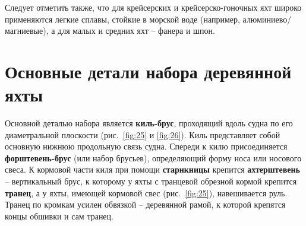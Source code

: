 \documentclass[a4paper, 12pt, twoside, final]{scrbook}
\begin{document}
Следует отметить также, что для крейсерских и крейсерско-гоночных
яхт широко применяются легкие сплавы, стойкие в морской воде (например,
алюминиево\-/магниевые), а для малых и средних яхт \--- фанера и шпон.

%
%

\section{Основные детали набора деревянной яхты}

Основной деталью набора является \textbf{киль-брус}, проходящий вдоль
судна по его диаметральной плоскости (рис.~\ref{fig:25}
и \ref{fig:26}).
Киль представляет собой основную нижнюю продольную связь судна. Спереди
к килю присоединяется \textbf{форштевень-брус} (или набор брусьев),
определяющий форму носа или носового свеса. К кормовой части киля
при помощи \textbf{старнкницы} крепится \textbf{ахтерштевень} \--- вертикальный
брус, к которому у яхты с транцевой обрезной кормой крепится \textbf{транец},
а у яхты, имеющей кормовой свес (рис.~\ref{fig:25}), навешивается руль. Транец
по кромкам усилен обвязкой \--- деревянной рамой, к которой крепятся
концы обшивки и сам транец.
\end{document}

